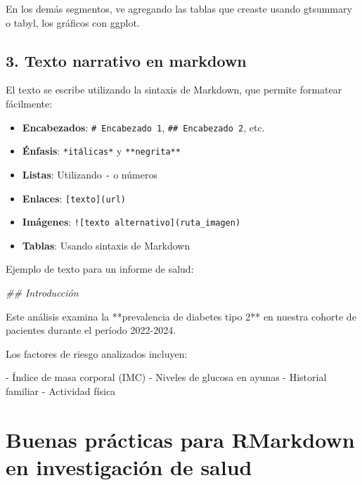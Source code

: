\documentclass[
  letterpaper,
  DIV=11,
  numbers=noendperiod]{scrreprt}
\newenvironment{Shaded}{\begin{snugshade}}{\end{snugshade}}
\newcommand{\DecValTok}[1]{\textcolor[rgb]{0.68,0.00,0.00}{#1}}
\newcommand{\DocumentationTok}[1]{\textcolor[rgb]{0.37,0.37,0.37}{\textit{#1}}}
\newcommand{\FloatTok}[1]{\textcolor[rgb]{0.68,0.00,0.00}{#1}}
\newcommand{\FunctionTok}[1]{\textcolor[rgb]{0.28,0.35,0.67}{#1}}
\newcommand{\NormalTok}[1]{\textcolor[rgb]{0.00,0.23,0.31}{#1}}
\newcommand{\SpecialCharTok}[1]{\textcolor[rgb]{0.37,0.37,0.37}{#1}}
\providecommand{\tightlist}{%
  \setlength{\itemsep}{0pt}\setlength{\parskip}{0pt}}\usepackage{longtable,booktabs,array}
\begin{document}
En los demás segmentos, ve agregando las tablas que creaste usando
gtsummary o tabyl, los gráficos con ggplot.

\subsection{3. Texto narrativo en
markdown}\label{texto-narrativo-en-markdown}

El texto se escribe utilizando la sintaxis de Markdown, que permite
formatear fácilmente:

\begin{itemize}
\tightlist
\item
  \textbf{Encabezados}: \texttt{\#\ Encabezado\ 1},
  \texttt{\#\#\ Encabezado\ 2}, etc.
\item
  \textbf{Énfasis}: \texttt{*itálicas*} y \texttt{**negrita**}
\item
  \textbf{Listas}: Utilizando \texttt{-} o números
\item
  \textbf{Enlaces}: \texttt{{[}texto{]}(url)}
\item
  \textbf{Imágenes}: \texttt{!{[}texto\ alternativo{]}(ruta\_imagen)}
\item
  \textbf{Tablas}: Usando sintaxis de Markdown
\end{itemize}

Ejemplo de texto para un informe de salud:

\begin{Shaded}
\begin{Highlighting}[]
\DocumentationTok{\#\# Introducción}

\NormalTok{Este análisis examina la }\SpecialCharTok{**}\NormalTok{prevalencia de diabetes tipo }\DecValTok{2}\SpecialCharTok{**}\NormalTok{ en nuestra cohorte de pacientes durante el período }\DecValTok{2022}\FloatTok{{-}2024.} 

\NormalTok{Los factores de riesgo analizados incluyen}\SpecialCharTok{:}

\SpecialCharTok{{-}}\NormalTok{ Índice de masa }\FunctionTok{corporal}\NormalTok{ (IMC)}
\SpecialCharTok{{-}}\NormalTok{ Niveles de glucosa en ayunas}
\SpecialCharTok{{-}}\NormalTok{ Historial familiar}
\SpecialCharTok{{-}}\NormalTok{ Actividad física}
\end{Highlighting}
\end{Shaded}

\section{Buenas prácticas para RMarkdown en investigación de
salud}\label{buenas-pruxe1cticas-para-rmarkdown-en-investigaciuxf3n-de-salud}
\end{document}
